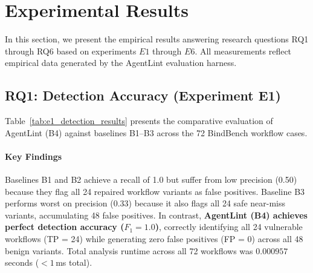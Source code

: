 \section{Experimental Results}
\label{sec:results}

In this section, we present the empirical results answering research questions RQ1 through RQ6 based on experiments $E1$ through $E6$. All measurements reflect empirical data generated by the AgentLint evaluation harness.

\subsection{RQ1: Detection Accuracy (Experiment E1)}
Table~\ref{tab:e1_detection_results} presents the comparative evaluation of AgentLint (B4) against baselines B1--B3 across the 72 \textsf{BindBench} workflow cases.

\begin{table}[h]
\centering
\caption{Comparative Detection Performance on \textsf{BindBench} (72 Workflows)}
\label{tab:e1_detection_results}
\end{table}

\paragraph{Key Findings}
Baselines B1 and B2 achieve a recall of 1.0 but suffer from low precision (0.50) because they flag all 24 repaired workflow variants as false positives. Baseline B3 performs worst on precision (0.33) because it also flags all 24 safe near-miss variants, accumulating 48 false positives. In contrast, \textbf{AgentLint (B4) achieves perfect detection accuracy ($F_1 = 1.0$)}, correctly identifying all 24 vulnerable workflows (TP = 24) while generating zero false positives (FP = 0) across all 48 benign variants. Total analysis runtime across all 72 workflows was $0.000957$\,seconds ($< 1$\,ms total).

